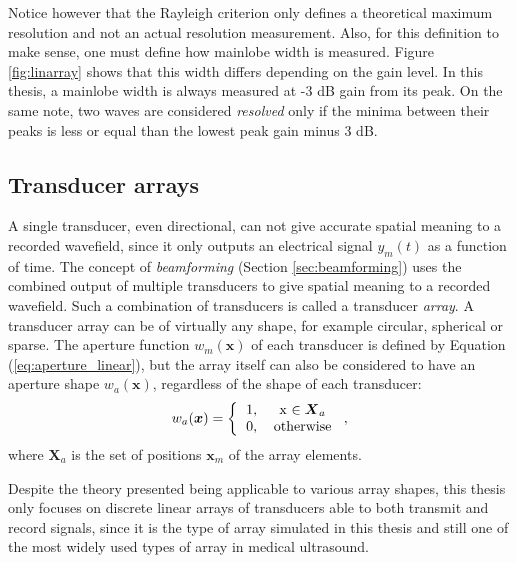 Notice however that the Rayleigh criterion only defines a theoretical maximum resolution and not an actual resolution measurement. Also, for this definition to make sense, one must define how mainlobe width is measured. Figure \ref{fig:linarray} shows that this width differs depending on the gain level. In this thesis, a mainlobe width is always measured at -3 dB gain from its peak. On the same note, two waves are considered \textit{resolved} only if the minima between their peaks is less or equal than the lowest peak gain minus 3 dB.

\subsection{Transducer arrays}
\label{sec:discrete_arrays}
A single transducer, even directional, can not give accurate spatial meaning to a recorded wavefield, since it only outputs an electrical signal $y_m(t)$ as a function of time.
The concept of \textit{beamforming} (Section \ref{sec:beamforming}) uses the combined output of multiple transducers to give spatial meaning to a recorded wavefield.
Such a combination of transducers is called a transducer \textit{array}. A transducer array can be of virtually any shape, for example circular, spherical or sparse.  The aperture function $w_m(\boldsymbol{x})$ of each transducer is defined by Equation (\ref{eq:aperture_linear}), but the array itself can also be considered to have an aperture shape $w_a(\boldsymbol{x})$, regardless of the shape of each transducer:
\begin{equation}
    w_a(\boldsymbol{x}) = \left \{ \begin{tabular}{cc}
        1, & x $\in \boldsymbol{X}_a$ \\
        0, & otherwise
    \end{tabular}\right.,
\label{eq:aperture_global}
\end{equation}
\noindent
where $\boldsymbol{X}_a$ is the set of positions $\boldsymbol{x}_m$ of the array elements.

Despite the theory presented being applicable to various array shapes, this thesis only focuses on discrete linear arrays of transducers able to both transmit and record signals, since it is the type of array simulated in this thesis and still one of the most widely used types of array in medical ultrasound.

